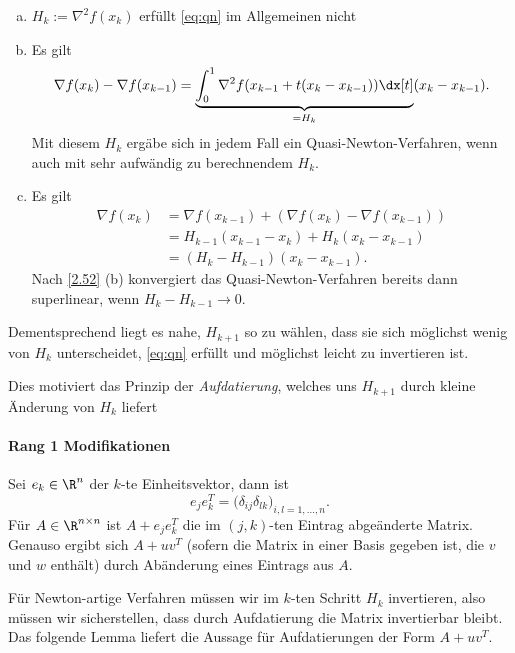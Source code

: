 \begin{nt} \label{2.54}
	\begin{enumerate}[(a)]
		\item
			$H_k := \nabla^2 f(x_k)$ erfüllt \eqref{eq:qn} im Allgemeinen nicht
		\item
			Es gilt
			\[
				\nabla f(x_k) - \nabla f(x_{k-1})
				= \underbrace{\int_0^1 \nabla^2 f(x_{k-1} + t (x_k - x_{k-1})) \dx[t]}_{= H_k} (x_k - x_{k-1}).
			\]
			Mit diesem $H_k$ ergäbe sich in jedem Fall ein Quasi-Newton-Verfahren, wenn auch mit sehr aufwändig zu berechnendem $H_k$.
		\item
			Es gilt
			\begin{align*}
				\nabla f(x_k)
				&= \nabla f(x_{k-1}) + ( \nabla f(x_k) - \nabla f(x_{k-1}) ) \\
				&= H_{k-1} (x_{k-1} - x_k) + H_k (x_k - x_{k-1}) \\
				&= (H_k - H_{k-1})(x_k - x_{k-1}).
			\end{align*}
			Nach \ref{2.52} (b) konvergiert das Quasi-Newton-Verfahren bereits dann superlinear, wenn $H_k - H_{k-1} \to 0$.
	\end{enumerate}
\end{nt}

Dementsprechend liegt es nahe, $H_{k+1}$ so zu wählen, dass sie sich möglichst wenig von $H_k$ unterscheidet, \eqref{eq:qn} erfüllt und möglichst leicht zu invertieren ist.

Dies motiviert das Prinzip der \emph{Aufdatierung}, welches uns $H_{k+1}$ durch kleine Änderung von $H_k$ liefert

\paragraph{Rang 1 Modifikationen}

Sei $e_k \in \R^n$ der $k$-te Einheitsvektor, dann ist
\[
	e_j e_k^T = \big( \delta_{ij}\delta_{lk} \big)_{i,l = 1, \dotsc, n}.
\]
Für $A \in \R^{n\times n}$ ist $A + e_j e_k^T$ die im $(j,k)$-ten Eintrag abgeänderte Matrix.
Genauso ergibt sich $A + uv^T$ (sofern die Matrix in einer Basis gegeben ist, die $v$ und $w$ enthält) durch Abänderung eines Eintrags aus $A$.

Für Newton-artige Verfahren müssen wir im $k$-ten Schritt $H_k$ invertieren, also müssen wir sicherstellen, dass durch Aufdatierung die Matrix invertierbar bleibt.
Das folgende Lemma liefert die Aussage für Aufdatierungen der Form $A + uv^T$.

